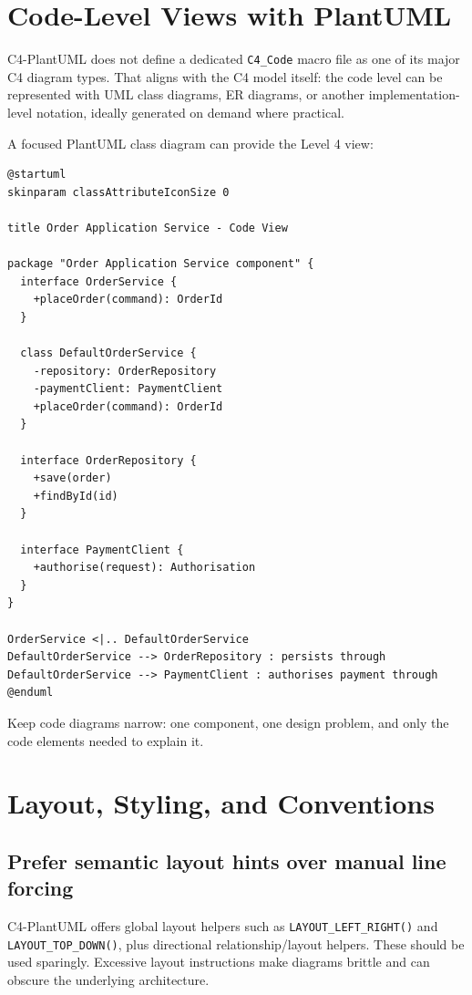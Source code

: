 \documentclass[11pt]{article}
\newcommand{\code}[1]{\texttt{#1}}
\begin{document}
\section{Code-Level Views with PlantUML}

C4-PlantUML does not define a dedicated \code{C4\_Code} macro file as one of its major C4 diagram types. That aligns with the C4 model itself: the code level can be represented with UML class diagrams, ER diagrams, or another implementation-level notation, ideally generated on demand where practical.\cite{c4code,c4plantuml}

A focused PlantUML class diagram can provide the Level 4 view:

\begin{lstlisting}[language=PlantUML]
@startuml
skinparam classAttributeIconSize 0

title Order Application Service - Code View

package "Order Application Service component" {
  interface OrderService {
    +placeOrder(command): OrderId
  }

  class DefaultOrderService {
    -repository: OrderRepository
    -paymentClient: PaymentClient
    +placeOrder(command): OrderId
  }

  interface OrderRepository {
    +save(order)
    +findById(id)
  }

  interface PaymentClient {
    +authorise(request): Authorisation
  }
}

OrderService <|.. DefaultOrderService
DefaultOrderService --> OrderRepository : persists through
DefaultOrderService --> PaymentClient : authorises payment through
@enduml
\end{lstlisting}

Keep code diagrams narrow: one component, one design problem, and only the code elements needed to explain it.

\section{Layout, Styling, and Conventions}

\subsection{Prefer semantic layout hints over manual line forcing}

C4-PlantUML offers global layout helpers such as \code{LAYOUT\_LEFT\_RIGHT()} and \code{LAYOUT\_TOP\_DOWN()}, plus directional relationship/layout helpers. These should be used sparingly. Excessive layout instructions make diagrams brittle and can obscure the underlying architecture.\cite{c4plantuml}
\end{document}
